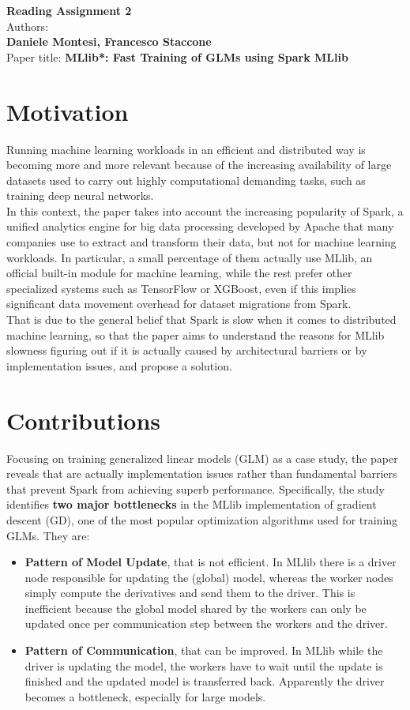 \documentclass[10pt]{proc}
\begin{document}
\large{\textbf{Reading Assignment 2}}\\

\large{Authors:\textbf{ \\Daniele Montesi, Francesco Staccone}}\\

\large{Paper title: \textbf{MLlib*: Fast Training of GLMs using Spark MLlib}}\\

\section{Motivation}
Running machine learning workloads in an efficient and distributed way is becoming more and more relevant because of the increasing availability of large datasets used to  
carry out highly computational demanding tasks, such as training deep neural networks.\\ In this context, the paper takes into account the increasing popularity of Spark, a unified analytics engine for big data processing developed by Apache that many companies use to extract and transform their data, but not for machine learning workloads. In particular, a small percentage of them actually use MLlib, an official built-in module for machine learning, while the rest prefer other specialized systems such as TensorFlow or XGBoost, even if this implies significant data movement overhead for dataset migrations from Spark.\\
That is due to the general belief that Spark is slow when it comes to distributed machine learning, so that the paper aims to understand the reasons for MLlib slowness figuring out if it is actually caused by  architectural barriers or by implementation issues, and propose a solution.
\section{Contributions}
Focusing on training generalized linear models (GLM) as a case study, the paper reveals that are actually implementation issues rather than fundamental barriers that prevent Spark from achieving superb performance. Specifically, the study identifies \textbf{two major bottlenecks} in the MLlib implementation of gradient descent (GD), one of the most popular optimization algorithms used for training GLMs. They are:
\begin{itemize}
    \item \textbf{Pattern of Model Update}, that is not efficient. In MLlib there is a driver node responsible for updating the (global) model, whereas the worker nodes simply compute the derivatives and send them to the driver. This is inefficient because the global model shared by the workers can only be updated once per communication step between the workers and the driver.
    \item \textbf{Pattern of Communication}, that can be improved. In MLlib while the driver is updating the model, the workers have to wait until the update is finished and the updated model is transferred back. Apparently the driver becomes a bottleneck, especially for large models.
\end{itemize}
\end{document}
